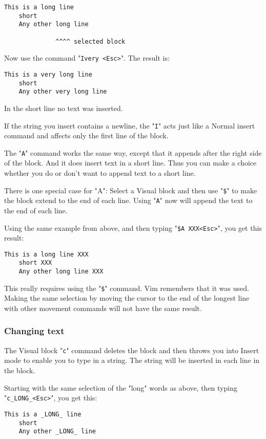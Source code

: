 \begin{Verbatim}[samepage=true]
    This is a long line 
    short 
    Any other long line 

              ^^^^ selected block
\end{Verbatim}

Now use the command "\verb!Ivery <Esc>!".
The result is:

\begin{Verbatim}[samepage=true]
    This is a very long line 
    short 
    Any other very long line 
\end{Verbatim}

In the short line no text was inserted.

If the string you insert contains a newline, the "\verb!I!" acts just like a Normal insert command and affects only the first line of the block.

The "\verb!A!" command works the same way, except that it appends after the right side of the block.
And it does insert text in a short line.
Thus you can make a choice whether you do or don't want to append text to a short line.

There is one special case for "A": Select a Visual block and then use "\verb!$!" to make the block extend to the end of each line.
Using "\verb!A!" now will append the text to the end of each line.

Using the same example from above, and then typing "\verb!$A XXX<Esc>!", you get this result:

\begin{Verbatim}[samepage=true]
    This is a long line XXX 
    short XXX 
    Any other long line XXX 
\end{Verbatim}

This really requires using the "\verb!$!" command.
Vim remembers that it was used.
Making the same selection by moving the cursor to the end of the longest line with other movement commands will not have the same result.
\subsubsection{Changing text}
The Visual block "\verb!c!" command deletes the block and then throws you into Insert mode to enable you to type in a string.
The string will be inserted in each line in the block.

Starting with the same selection of the "long" words as above, then typing "\verb!c_LONG_<Esc>!", you get this:

\begin{Verbatim}[samepage=true]
    This is a _LONG_ line 
    short 
    Any other _LONG_ line 
\end{Verbatim}

